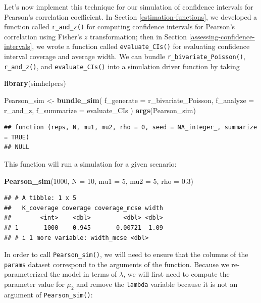 \documentclass[
]{book}
\newenvironment{Shaded}{\begin{snugshade}}{\end{snugshade}}
\newcommand{\AttributeTok}[1]{\textcolor[rgb]{0.13,0.29,0.53}{#1}}
\newcommand{\DecValTok}[1]{\textcolor[rgb]{0.00,0.00,0.81}{#1}}
\newcommand{\FloatTok}[1]{\textcolor[rgb]{0.00,0.00,0.81}{#1}}
\newcommand{\FunctionTok}[1]{\textcolor[rgb]{0.13,0.29,0.53}{\textbf{#1}}}
\newcommand{\NormalTok}[1]{#1}
\newcommand{\OtherTok}[1]{\textcolor[rgb]{0.56,0.35,0.01}{#1}}
\begin{document}
Let's now implement this technique for our simulation of confidence intervals for Pearson's correlation coefficient.
In Section \ref{estimation-functions}, we developed a function called \texttt{r\_and\_z()} for computing confidence intervals for Pearson's correlation using Fisher's \(z\) transformation;
then in Section \ref{assessing-confidence-intervals}, we wrote a function called \texttt{evaluate\_CIs()} for evaluating confidence interval coverage and average width.
We can bundle \texttt{r\_bivariate\_Poisson()}, \texttt{r\_and\_z()}, and \texttt{evaluate\_CIs()} into a simulation driver function by taking

\begin{Shaded}
\begin{Highlighting}[]
\FunctionTok{library}\NormalTok{(simhelpers)}

\NormalTok{Pearson\_sim }\OtherTok{\textless{}{-}} \FunctionTok{bundle\_sim}\NormalTok{(}
  \AttributeTok{f\_generate =}\NormalTok{ r\_bivariate\_Poisson, }\AttributeTok{f\_analyze =}\NormalTok{ r\_and\_z, }\AttributeTok{f\_summarize =}\NormalTok{ evaluate\_CIs}
\NormalTok{)}
\FunctionTok{args}\NormalTok{(Pearson\_sim)}
\end{Highlighting}
\end{Shaded}

\begin{verbatim}
## function (reps, N, mu1, mu2, rho = 0, seed = NA_integer_, summarize = TRUE) 
## NULL
\end{verbatim}

This function will run a simulation for a given scenario:

\begin{Shaded}
\begin{Highlighting}[]
\FunctionTok{Pearson\_sim}\NormalTok{(}\DecValTok{1000}\NormalTok{, }\AttributeTok{N =} \DecValTok{10}\NormalTok{, }\AttributeTok{mu1 =} \DecValTok{5}\NormalTok{, }\AttributeTok{mu2 =} \DecValTok{5}\NormalTok{, }\AttributeTok{rho =} \FloatTok{0.3}\NormalTok{)}
\end{Highlighting}
\end{Shaded}

\begin{verbatim}
## # A tibble: 1 x 5
##   K_coverage coverage coverage_mcse width
##        <int>    <dbl>         <dbl> <dbl>
## 1       1000    0.945       0.00721  1.09
## # i 1 more variable: width_mcse <dbl>
\end{verbatim}

In order to call \texttt{Pearson\_sim()}, we will need to ensure that the columns of the \texttt{params} dataset correspond to the arguments of the function.
Because we re-parameterized the model in terms of \(\lambda\), we will first need to compute the parameter value for \(\mu_2\) and remove the \texttt{lambda} variable because it is not an argument of \texttt{Pearson\_sim()}:
\end{document}
